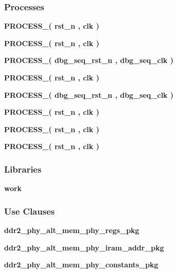 \subsubsection*{Processes}
 \begin{DoxyCompactItemize}
\item 
{\bf P\+R\+O\+C\+E\+S\+S\+\_}{\bfseries  ( {\bfseries {\bfseries {\bf rst\+\_\+n}} \textcolor{vhdlchar}{ }} , {\bfseries {\bfseries {\bf clk}} \textcolor{vhdlchar}{ }} )}
\item 
{\bf P\+R\+O\+C\+E\+S\+S\+\_}{\bfseries  ( {\bfseries {\bfseries {\bf rst\+\_\+n}} \textcolor{vhdlchar}{ }} , {\bfseries {\bfseries {\bf clk}} \textcolor{vhdlchar}{ }} )}
\item 
{\bf P\+R\+O\+C\+E\+S\+S\+\_}{\bfseries  ( {\bfseries {\bfseries {\bf dbg\+\_\+seq\+\_\+rst\+\_\+n}} \textcolor{vhdlchar}{ }} , {\bfseries {\bfseries {\bf dbg\+\_\+seq\+\_\+clk}} \textcolor{vhdlchar}{ }} )}
\item 
{\bf P\+R\+O\+C\+E\+S\+S\+\_}{\bfseries  ( {\bfseries {\bfseries {\bf rst\+\_\+n}} \textcolor{vhdlchar}{ }} , {\bfseries {\bfseries {\bf clk}} \textcolor{vhdlchar}{ }} )}
\item 
{\bf P\+R\+O\+C\+E\+S\+S\+\_}{\bfseries  ( {\bfseries {\bfseries {\bf dbg\+\_\+seq\+\_\+rst\+\_\+n}} \textcolor{vhdlchar}{ }} , {\bfseries {\bfseries {\bf dbg\+\_\+seq\+\_\+clk}} \textcolor{vhdlchar}{ }} )}
\item 
{\bf P\+R\+O\+C\+E\+S\+S\+\_}{\bfseries  ( {\bfseries {\bfseries {\bf rst\+\_\+n}} \textcolor{vhdlchar}{ }} , {\bfseries {\bfseries {\bf clk}} \textcolor{vhdlchar}{ }} )}
\item 
{\bf P\+R\+O\+C\+E\+S\+S\+\_}{\bfseries  ( {\bfseries {\bfseries {\bf rst\+\_\+n}} \textcolor{vhdlchar}{ }} , {\bfseries {\bfseries {\bf clk}} \textcolor{vhdlchar}{ }} )}
\item 
{\bf P\+R\+O\+C\+E\+S\+S\+\_}{\bfseries  ( {\bfseries {\bfseries {\bf rst\+\_\+n}} \textcolor{vhdlchar}{ }} , {\bfseries {\bfseries {\bf clk}} \textcolor{vhdlchar}{ }} )}
\end{DoxyCompactItemize}
\subsubsection*{Libraries}
 \begin{DoxyCompactItemize}
\item 
{\bf work} 
\end{DoxyCompactItemize}
\subsubsection*{Use Clauses}
 \begin{DoxyCompactItemize}
\item 
{\bf ddr2\+\_\+phy\+\_\+alt\+\_\+mem\+\_\+phy\+\_\+regs\+\_\+pkg}   
\item 
{\bf ddr2\+\_\+phy\+\_\+alt\+\_\+mem\+\_\+phy\+\_\+iram\+\_\+addr\+\_\+pkg}   
\item 
{\bf ddr2\+\_\+phy\+\_\+alt\+\_\+mem\+\_\+phy\+\_\+constants\+\_\+pkg}   
\end{DoxyCompactItemize}
